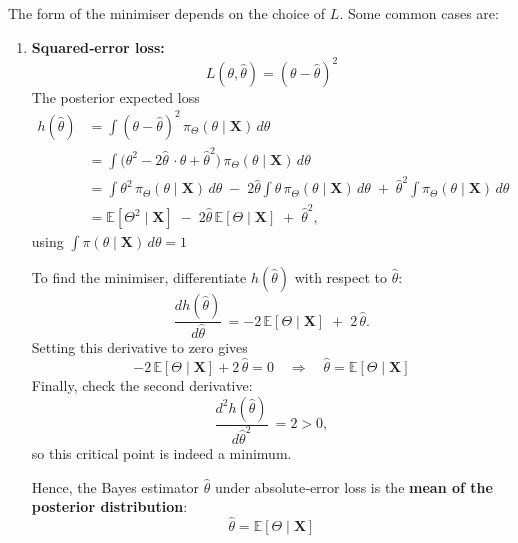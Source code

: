 \documentclass[twoside]{book}
\begin{document}
The form of the minimiser depends on the choice of \(L\). Some common cases are:
\begin{enumerate}
  \item \textbf{Squared‐error loss:}
    \[
      L(\theta,\hat{\theta}) = (\theta - \hat{\theta})^2
    \]
    The posterior expected loss
    \begin{align*}
      h(\hat{\theta})
      &= \int (\theta - \hat{\theta})^2 \,\pi_{\Theta}(\theta \mid \mathbf{X})\,d\theta\\
      &= \int \bigl(\theta^2 - 2\hat{\theta}\,\cdot\theta + \hat{\theta}^2\bigr)\,\pi_{\Theta}(\theta\mid\mathbf{X})\,d\theta \\[6pt]
      &= \int \theta^2\,\pi_{\Theta}(\theta\mid\mathbf{X})\,d\theta
        \;-\; 2\hat{\theta}\int \theta\,\pi_{\Theta}(\theta\mid\mathbf{X})\,d\theta
        \;+\; \hat{\theta}^2\int \pi_{\Theta}(\theta\mid\mathbf{X})\,d\theta \\[4pt]
      &= \mathbb{E}[\Theta^2\mid\mathbf{X}]
        \;-\; 2\hat{\theta}\,\mathbb{E}[\Theta\mid\mathbf{X}]
        \;+\; \hat{\theta}^2,
    \end{align*}
    using \(\int\pi(\theta\mid\mathbf{X})\,d\theta=1\)

    To find the minimiser, differentiate \(h(\hat{\theta})\) with respect to \(\hat{\theta}\):
    \[
      \frac{dh(\hat{\theta})}{d\hat{\theta}}\,
      = -2\,\mathbb{E}[\Theta\mid\mathbf{X}]
        \;+\; 2\,\hat{\theta}.
    \]
    Setting this derivative to zero gives
    \[
      -2\,\mathbb{E}[\Theta\mid\mathbf{X}] + 2\,\hat{\theta}
      = 0
      \quad\Longrightarrow\quad
      \hat{\theta}
      = \mathbb{E}[\Theta\mid\mathbf{X}]
    \]
    Finally, check the second derivative:
    \[
      \frac{d^2h(\hat{\theta})}{d\hat{\theta}^2}\
      = 2 > 0,
    \]
    so this critical point is indeed a minimum.

    Hence, the Bayes estimator \(\hat{\theta}\) under absolute‐error loss is the \textbf{mean of the posterior distribution}:
    \[
      \hat{\theta} = \mathbb{E}[\Theta\mid \mathbf{X}]
    \]


\end{enumerate}
\end{document}
